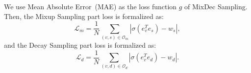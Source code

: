 We use Mean Absolute Error~(MAE) as the loss function $g$ of MixDec Sampling. Then, the Mixup Sampling part loss is formalized as:
\begin{equation}
\mathcal{L}_{m}=\frac{1}{N}\sum_{(v,s) \in\mathcal{O}_m} \left|\sigma\left(e_v^T e_{s}\right)-w_s\right|,
\end{equation}
and the Decay Sampling part loss is formalized as:
\begin{equation}
\mathcal{L}_{d}= \frac{1}{N}\sum_{(v,d) \in\mathcal{O}_d} \left|\sigma\left(e_v^T e_{d}\right)-w_d\right|.
\end{equation}

%
